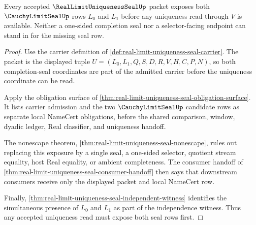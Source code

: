\begin{theorem}
\label{thm:real-limit-uniqueness-seal-two-seal-exposure}
Every accepted $\RealLimitUniquenessSealUp$ packet exposes both $\CauchyLimitSealUp$ rows $L_0$ and $L_1$ before any uniqueness read through $V$ is available. Neither a one-sided completion seal nor a selector-facing endpoint can stand in for the missing seal row.
\end{theorem}
\begin{proof}
Use the carrier definition of \autoref{def:real-limit-uniqueness-seal-carrier}. The packet is the displayed tuple $U=(L_0,L_1,Q,S,D,R,V,H,C,P,N)$, so both completion-seal coordinates are part of the admitted carrier before the uniqueness coordinate can be read.

Apply the obligation surface of \autoref{thm:real-limit-uniqueness-seal-obligation-surface}. It lists carrier admission and the two $\CauchyLimitSealUp$ candidate rows as separate local NameCert obligations, before the shared comparison, window, dyadic ledger, Real classifier, and uniqueness handoff.

The nonescape theorem, \autoref{thm:real-limit-uniqueness-seal-nonescape}, rules out replacing this exposure by a single seal, a one-sided selector, quotient stream equality, host Real equality, or ambient completeness. The consumer handoff of \autoref{thm:real-limit-uniqueness-seal-consumer-handoff} then says that downstream consumers receive only the displayed packet and local NameCert row.

Finally, \autoref{thm:real-limit-uniqueness-seal-independent-witness} identifies the simultaneous presence of $L_0$ and $L_1$ as part of the independence witness. Thus any accepted uniqueness read must expose both seal rows first.
\end{proof}

